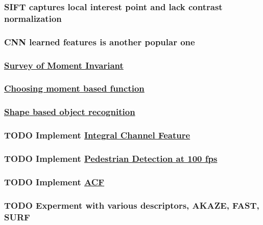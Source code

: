 \documentclass[11pt]{article}
\begin{document}
\subsubsection{SIFT captures local interest point and lack contrast normalization}
\label{sec:orgb0b21b0}
\subsubsection{CNN learned features is another popular one}
\label{sec:org96b19d8}
\subsubsection{\href{http://citeseerx.ist.psu.edu/viewdoc/download?doi=10.1.1.308.1785\&rep=rep1\&type=pdf}{Survey of Moment Invariant}}
\label{sec:org126924f}
\subsubsection{\href{http://www.indjst.org/index.php/indjst/article/viewFile/95209/70254}{Choosing moment based function}}
\label{sec:org57604bd}
\subsubsection{\href{https://pdfs.semanticscholar.org/5849/88271268671bb7442221a40a17ee909c04e7.pdf}{Shape based object recognition}}
\label{sec:org62d5c69}
\subsubsection{{\bfseries\sffamily TODO} Implement \href{https://vision.cornell.edu/se3/wp-content/uploads/2014/09/dollarBMVC09ChnFtrs\_0.pdf}{Integral Channel Feature}}
\label{sec:org41c1b21}
\subsubsection{{\bfseries\sffamily TODO} Implement \href{https://pdfs.semanticscholar.org/4f23/a446f1f15d0ac65e4e50232531f8eb404a7b.pdf}{Pedestrian Detection at 100 fps}}
\label{sec:org9fe88c2}
\subsubsection{{\bfseries\sffamily TODO} Implement \href{https://pdollar.github.io/files/papers/DollarPAMI14pyramids.pdf}{ACF}}
\label{sec:org01d7f42}
\subsubsection{{\bfseries\sffamily TODO} Experment with various descriptors, AKAZE, FAST, SURF}
\label{sec:org280ab0b}
\end{document}
